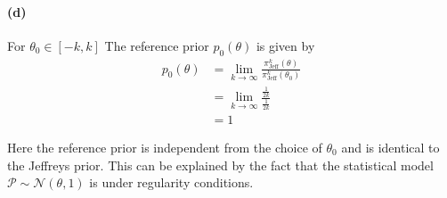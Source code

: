 \paragraph{(d)}
For $\theta_0 \in [-k, k]$ The reference prior $p_0(\theta)$ is given by
\begin{align*}
    p_0(\theta)
    &= \lim_{k\rightarrow \infty} \frac{\pi_\mathrm{Jeff}^k (\theta)}{\pi_\mathrm{Jeff}^k (\theta_0)}\\
    &= \lim_{k\rightarrow \infty} \frac{\frac{1}{2k}}{\frac{1}{2k}}\\
    &= 1
\end{align*}

Here the reference prior is independent from the choice of $\theta_0$ and is identical to the Jeffreys prior. This can be explained by the fact that the statistical model $\mathcal{P} \sim \mathcal{N}(\theta, 1)$ is under regularity conditions.
